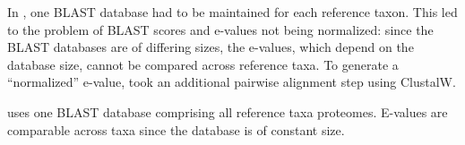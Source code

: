 In \hamstr, one BLAST database had to be maintained for each reference taxon.
This led to the problem of BLAST scores and e-values not being normalized: since
the \hamstr BLAST databases are of differing sizes, the e-values, which depend
on the database size, cannot be compared across reference taxa. To generate a
``normalized'' e-value, \hamstr took an additional pairwise alignment step using
ClustalW.

\pname uses one BLAST database comprising all reference taxa proteomes. E-values
are comparable across taxa since the database is of constant size. 
